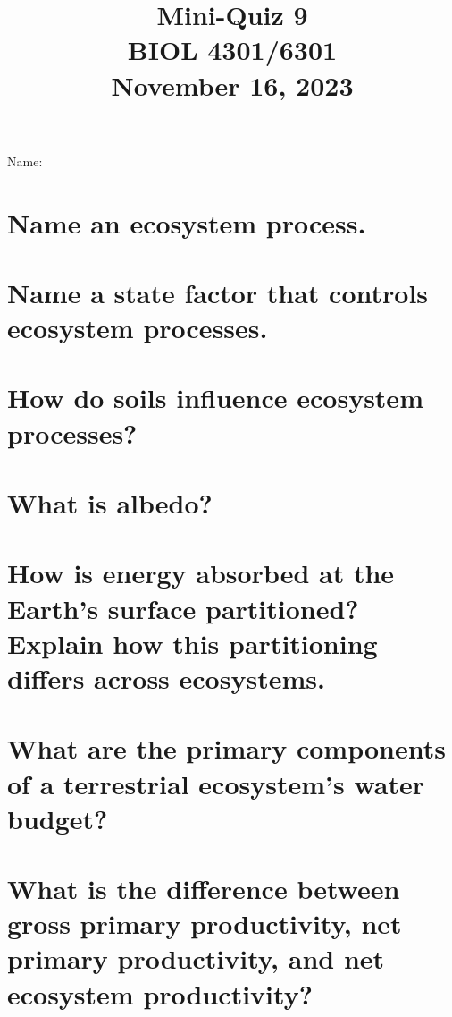 \documentclass[12pt, notitlepage]{article}   	%
\title{
	\textbf{
		Mini-Quiz 9
	} \\
	\large BIOL 4301/6301 \\
	\large November 16, 2023 \\
}
\date{\vspace{-5ex}}
\def\wl{\par \vspace{\baselineskip}}
\begin{document}
{\selectfont %

\large{Name:}

{\let\newpage\relax\maketitle}

\section{\small{Name an ecosystem process.}}

\wl
\wl
\wl
\wl

\section{\small{Name a state factor that controls ecosystem processes.}}

\wl
\wl
\wl
\wl

\section{\small{How do soils influence ecosystem processes?}}

\newpage

\section{\small{What is albedo?}}

\wl
\wl
\wl
\wl

\section{\small{How is energy absorbed at the Earth's surface partitioned?
Explain how this partitioning differs across ecosystems.}}

\wl
\wl
\wl
\wl
\wl
\wl
\wl
\wl
\wl
\wl
\wl
\wl

\section{\small{What are the primary components of a terrestrial ecosystem's water budget?}}

\newpage

\section{\small{What is the difference between gross primary productivity, net primary productivity,
and net ecosystem productivity?}}

}
\end{document}
